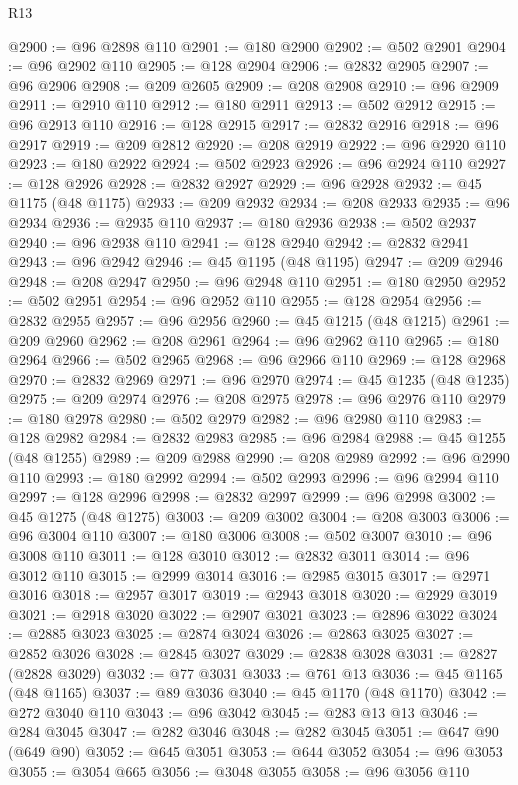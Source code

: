 \begin{lexlean}{R13}
\begin{coremodule}
@2900 := @96 @2898 @110
@2901 := @180 @2900
@2902 := @502 @2901
@2904 := @96 @2902 @110
@2905 := @128 @2904
@2906 := @2832 @2905
@2907 := @96 @2906
@2908 := @209 @2605
@2909 := @208 @2908
@2910 := @96 @2909
@2911 := @2910 @110
@2912 := @180 @2911
@2913 := @502 @2912
@2915 := @96 @2913 @110
@2916 := @128 @2915
@2917 := @2832 @2916
@2918 := @96 @2917
@2919 := @209 @2812
@2920 := @208 @2919
@2922 := @96 @2920 @110
@2923 := @180 @2922
@2924 := @502 @2923
@2926 := @96 @2924 @110
@2927 := @128 @2926
@2928 := @2832 @2927
@2929 := @96 @2928
@2932 := @45 @1175 (@48 @1175)
@2933 := @209 @2932
@2934 := @208 @2933
@2935 := @96 @2934
@2936 := @2935 @110
@2937 := @180 @2936
@2938 := @502 @2937
@2940 := @96 @2938 @110
@2941 := @128 @2940
@2942 := @2832 @2941
@2943 := @96 @2942
@2946 := @45 @1195 (@48 @1195)
@2947 := @209 @2946
@2948 := @208 @2947
@2950 := @96 @2948 @110
@2951 := @180 @2950
@2952 := @502 @2951
@2954 := @96 @2952 @110
@2955 := @128 @2954
@2956 := @2832 @2955
@2957 := @96 @2956
@2960 := @45 @1215 (@48 @1215)
@2961 := @209 @2960
@2962 := @208 @2961
@2964 := @96 @2962 @110
@2965 := @180 @2964
@2966 := @502 @2965
@2968 := @96 @2966 @110
@2969 := @128 @2968
@2970 := @2832 @2969
@2971 := @96 @2970
@2974 := @45 @1235 (@48 @1235)
@2975 := @209 @2974
@2976 := @208 @2975
@2978 := @96 @2976 @110
@2979 := @180 @2978
@2980 := @502 @2979
@2982 := @96 @2980 @110
@2983 := @128 @2982
@2984 := @2832 @2983
@2985 := @96 @2984
@2988 := @45 @1255 (@48 @1255)
@2989 := @209 @2988
@2990 := @208 @2989
@2992 := @96 @2990 @110
@2993 := @180 @2992
@2994 := @502 @2993
@2996 := @96 @2994 @110
@2997 := @128 @2996
@2998 := @2832 @2997
@2999 := @96 @2998
@3002 := @45 @1275 (@48 @1275)
@3003 := @209 @3002
@3004 := @208 @3003
@3006 := @96 @3004 @110
@3007 := @180 @3006
@3008 := @502 @3007
@3010 := @96 @3008 @110
@3011 := @128 @3010
@3012 := @2832 @3011
@3014 := @96 @3012 @110
@3015 := @2999 @3014
@3016 := @2985 @3015
@3017 := @2971 @3016
@3018 := @2957 @3017
@3019 := @2943 @3018
@3020 := @2929 @3019
@3021 := @2918 @3020
@3022 := @2907 @3021
@3023 := @2896 @3022
@3024 := @2885 @3023
@3025 := @2874 @3024
@3026 := @2863 @3025
@3027 := @2852 @3026
@3028 := @2845 @3027
@3029 := @2838 @3028
@3031 := @2827 (@2828 @3029)
@3032 := @77 @3031
@3033 := @761 @13
@3036 := @45 @1165 (@48 @1165)
@3037 := @89 @3036
@3040 := @45 @1170 (@48 @1170)
@3042 := @272 @3040 @110
@3043 := @96 @3042
@3045 := @283 @13 @13
@3046 := @284 @3045
@3047 := @282 @3046
@3048 := @282 @3045
@3051 := @647 @90 (@649 @90)
@3052 := @645 @3051
@3053 := @644 @3052
@3054 := @96 @3053
@3055 := @3054 @665
@3056 := @3048 @3055
@3058 := @96 @3056 @110

\end{coremodule}
\end{lexlean}

